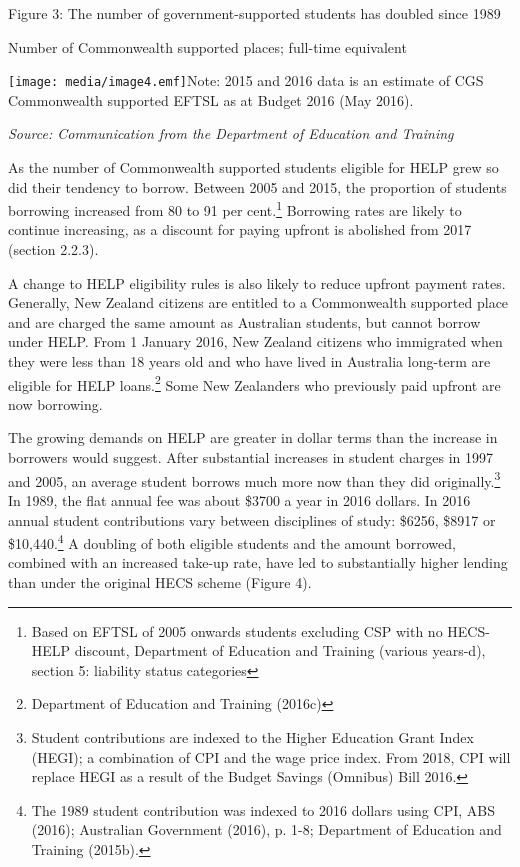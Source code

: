 \documentclass[]{book}
\begin{document}
\protect\hypertarget{_Ref333839322}{}{}Figure 3: The number of government-supported students has doubled since 1989

Number of Commonwealth supported places; full-time equivalent

\texttt{[image: media/image4.emf]}Note: 2015 and 2016 data is an estimate of CGS Commonwealth supported EFTSL as at Budget 2016 (May 2016).

\emph{Source: Communication from the Department of Education and Training}

As the number of Commonwealth supported students eligible for HELP grew so did their tendency to borrow. Between 2005 and 2015, the proportion of students borrowing increased from 80 to 91 per cent.\footnote{Based on EFTSL of 2005 onwards students excluding CSP with no HECS-HELP discount, Department of Education and Training (various years-d), section 5: liability status categories} Borrowing rates are likely to continue increasing, as a discount for paying upfront is abolished from 2017 (section 2.2.3).

A change to HELP eligibility rules is also likely to reduce upfront payment rates. Generally, New Zealand citizens are entitled to a Commonwealth supported place and are charged the same amount as Australian students, but cannot borrow under HELP. From 1 January 2016, New Zealand citizens who immigrated when they were less than 18 years old and who have lived in Australia long-term are eligible for HELP loans.\footnote{Department of Education and Training (2016c)} Some New Zealanders who previously paid upfront are now borrowing.

The growing demands on HELP are greater in dollar terms than the increase in borrowers would suggest. After substantial increases in student charges in 1997 and 2005, an average student borrows much more now than they did originally.\footnote{Student contributions are indexed to the Higher Education Grant Index (HEGI); a combination of CPI and the wage price index. From 2018, CPI will replace HEGI as a result of the Budget Savings (Omnibus) Bill 2016.} In 1989, the flat annual fee was about \$3700 a year in 2016 dollars. In 2016 annual student contributions vary between disciplines of study: \$6256, \$8917 or \$10,440.\footnote{The 1989 student contribution was indexed to 2016 dollars using CPI, ABS (2016); Australian Government (2016), p. 1-8; Department of Education and Training (2015b).} A doubling of both eligible students and the amount borrowed, combined with an increased take-up rate, have led to substantially higher lending than under the original HECS scheme (Figure 4).
\end{document}
